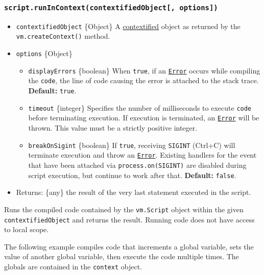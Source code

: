 \subsubsection{\texorpdfstring{\texttt{script.runInContext(contextifiedObject{[},\ options{]})}}{script.runInContext(contextifiedObject{[}, options{]})}}\label{script.runincontextcontextifiedobject-options}

\begin{itemize}
\tightlist
\item
  \texttt{contextifiedObject} \{Object\} A
  \hyperref[what-does-it-mean-to-contextify-an-object]{contextified}
  object as returned by the \texttt{vm.createContext()} method.
\item
  \texttt{options} \{Object\}

  \begin{itemize}
  \tightlist
  \item
    \texttt{displayErrors} \{boolean\} When \texttt{true}, if an
    \href{errors.md\#class-error}{\texttt{Error}} occurs while compiling
    the \texttt{code}, the line of code causing the error is attached to
    the stack trace. \textbf{Default:} \texttt{true}.
  \item
    \texttt{timeout} \{integer\} Specifies the number of milliseconds to
    execute \texttt{code} before terminating execution. If execution is
    terminated, an \href{errors.md\#class-error}{\texttt{Error}} will be
    thrown. This value must be a strictly positive integer.
  \item
    \texttt{breakOnSigint} \{boolean\} If \texttt{true}, receiving
    \texttt{SIGINT} (Ctrl+C) will terminate execution and throw an
    \href{errors.md\#class-error}{\texttt{Error}}. Existing handlers for
    the event that have been attached via
    \texttt{process.on(\textquotesingle{}SIGINT\textquotesingle{})} are
    disabled during script execution, but continue to work after that.
    \textbf{Default:} \texttt{false}.
  \end{itemize}
\item
  Returns: \{any\} the result of the very last statement executed in the
  script.
\end{itemize}

Runs the compiled code contained by the \texttt{vm.Script} object within
the given \texttt{contextifiedObject} and returns the result. Running
code does not have access to local scope.

The following example compiles code that increments a global variable,
sets the value of another global variable, then execute the code
multiple times. The globals are contained in the \texttt{context}
object.

